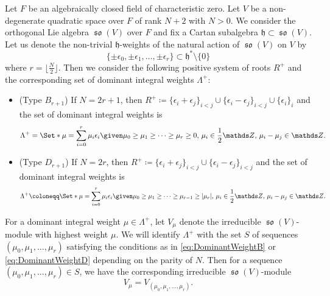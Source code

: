 \documentclass[12pt,reqno]{amsart}
\theoremstyle{definition}
\newcommand{\Z}{{\mathds Z}}
\newcommand\so{\mathop{\mathfrak{so}}\nolimits}
\newcommand{\frh}{\mathfrak{h}}
\numberwithin{equation}{section}
\begin{document}
Let $F$ be an algebraically closed field of characteristic zero.
Let $V$ be a non-degenerate quadratic space over $F$ of rank $N+2$ with $N>0$.
We consider the orthogonal Lie algebra
$\so(V)$ over $F$ and fix a Cartan subalgebra $\frh \subset \so(V)$.
Let us denote the non-trivial $\frh$-weights of the natural action of $\so(V)$ on 
$V$ by
\[
\{ \pm \epsilon_0, \pm \epsilon_1, \ldots, \pm \epsilon_r \} \subset \frh^*\setminus \{0 \}
\]
where $r = \lfloor \frac{N}{2} \rfloor$.
Then we consider the following positive system of roots $R^+$ and the corresponding set of dominant integral weights $\Lambda^+$:
\begin{itemize}[leftmargin=*]
    \item (Type $B_{r+1}$) If $N =2r+1$, then
    $
    R^+ \coloneqq \{ \epsilon_i + \epsilon_j \}_{i < j} \cup \{ \epsilon_i - \epsilon_j\}_{i < j} \cup \{ \epsilon_i \}_i
    $
    and the set of dominant integral weights is
    \begin{equation}\label{eq:DominantWeightB}
    \Lambda^+ = \Set*{ \mu =\sum_{i=0}^{r} \mu_i \epsilon_i \given \mu_0\geq \mu_1 \geq \cdots \geq \mu_{r} \geq 0, \, \mu_i \in \frac{1}{2} \Z, \, \mu_i-\mu_j \in \Z}.
    \end{equation}
    \item (Type $D_{r+1}$) If $N = 2r$, then $
    R^+ \coloneqq \{ \epsilon_i + \epsilon_j \}_{i < j} \cup \{ \epsilon_i - \epsilon_j\}_{i < j}
    $
    and the set of dominant integral weights is
    \begin{equation}\label{eq:DominantWeightD}
    \Lambda^+ \coloneqq \Set*{\mu =\sum_{i=0}^{r} \mu_i \epsilon_i \given \mu_0 \geq \mu_1 \geq \cdots \geq \mu_{r-1} \geq \vert\mu_r\vert, \, \mu_i \in \frac{1}{2} \Z, \, \mu_i-\mu_j \in \Z}.
    \end{equation}
\end{itemize}
For a dominant integral weight $\mu \in \Lambda^+$,
let $V_{\mu}$ denote the irreducible $\so(V)$-module with highest weight $\mu$.
We will identify $\Lambda^+$ with the set
    $S$
    of
    sequences
    $
    (\mu_0, \mu_1, \dotsc, \mu_r)
    $
    satisfying the conditions as in \eqref{eq:DominantWeightB} or \eqref{eq:DominantWeightD} depending on the parity of $N$.
    Then
    for a sequence
    $(\mu_0, \mu_1, \dotsc, \mu_r) \in S$,
    we have the corresponding irreducible $\so(V)$-module
    \[
    V_{\mu} = V_{(\mu_0, \mu_1, \dotsc, \mu_r)}.
    \]
\end{document}
